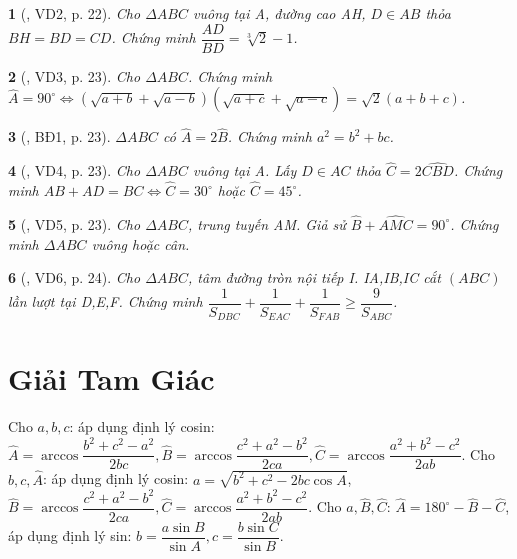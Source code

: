 \documentclass{article}
\newtheorem{baitoan}{}
\begin{document}
\begin{baitoan}[\cite{Hai_Hung_Thu_Tung2022_tap_1}, VD2, p. 22]
	Cho $\Delta ABC$ vuông tại A, đường cao AH, $D\in AB$ thỏa $BH = BD = CD$. Chứng minh $\dfrac{AD}{BD} = \sqrt[3]{2} - 1$.
\end{baitoan}

\begin{baitoan}[\cite{Hai_Hung_Thu_Tung2022_tap_1}, VD3, p. 23]
	Cho $\Delta ABC$. Chứng minh $\widehat{A} = 90^\circ\Leftrightarrow(\sqrt{a + b} + \sqrt{a - b})(\sqrt{a + c} + \sqrt{a - c}) = \sqrt{2}(a + b + c)$.
\end{baitoan}

\begin{baitoan}[\cite{Hai_Hung_Thu_Tung2022_tap_1}, BĐ1, p. 23]
	$\Delta ABC$ có $\widehat{A} = 2\widehat{B}$. Chứng minh $a^2 = b^2 + bc$.
\end{baitoan}

\begin{baitoan}[\cite{Hai_Hung_Thu_Tung2022_tap_1}, VD4, p. 23]
	Cho $\Delta ABC$ vuông tại A. Lấy $D\in AC$ thỏa $\widehat{C} = 2\widehat{CBD}$. Chứng minh $AB + AD = BC\Leftrightarrow\widehat{C} = 30^\circ$ hoặc $\widehat{C} = 45^\circ$.
\end{baitoan}

\begin{baitoan}[\cite{Hai_Hung_Thu_Tung2022_tap_1}, VD5, p. 23]
	Cho $\Delta ABC$, trung tuyến AM. Giả sử $\widehat{B} + \widehat{AMC} = 90^\circ$. Chứng minh $\Delta ABC$ vuông hoặc cân.
\end{baitoan}

\begin{baitoan}[\cite{Hai_Hung_Thu_Tung2022_tap_1}, VD6, p. 24]
	Cho $\Delta ABC$, tâm đường tròn nội tiếp I. IA,IB,IC cắt $(ABC)$ lần lượt tại D,E,F. Chứng minh $\dfrac{1}{S_{DBC}} + \dfrac{1}{S_{EAC}} + \dfrac{1}{S_{FAB}}\ge\dfrac{9}{S_{ABC}}$.
\end{baitoan}


\section{Giải Tam Giác}
 Cho $a,b,c$: áp dụng định lý cosin: $\widehat{A} = \arccos\dfrac{b^2 + c^2 - a^2}{2bc},\widehat{B} = \arccos\dfrac{c^2 + a^2 - b^2}{2ca},\widehat{C} = \arccos\dfrac{a^2 + b^2 - c^2}{2ab}$.  Cho $b,c,\widehat{A}$: áp dụng định lý cosin: $a = \sqrt{b^2 + c^2 - 2bc\cos A}$, $\widehat{B} = \arccos\dfrac{c^2 + a^2 - b^2}{2ca},\widehat{C} = \arccos\dfrac{a^2 + b^2 - c^2}{2ab}$.  Cho $a,\widehat{B},\widehat{C}$: $\widehat{A} = 180^\circ - \widehat{B} - \widehat{C}$, áp dụng định lý sin: $b = \dfrac{a\sin B}{\sin A},c = \dfrac{b\sin C}{\sin B}$.
\end{document}
